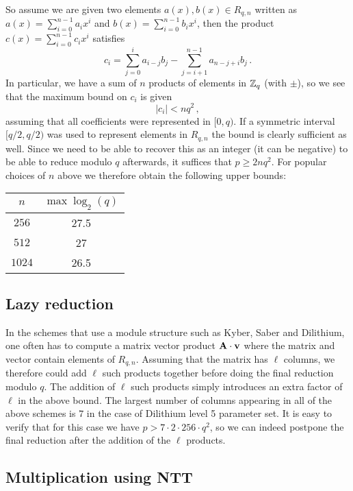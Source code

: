 So assume we are given two elements  $a(x), b(x) \in R_{q,n}$ written as $a(x) = \sum_{i = 0}^{n-1} a_i x^i$
and $b(x) = \sum_{i = 0}^{n-1} b_i x^i$, then the product $c(x) = \sum_{i = 0}^{n-1} c_i x^i$ satisfies
\[  c_i = \sum_{j = 0}^{i} a_{i -j} b_j  - \sum_{j = i+1}^{n-1} a_{n-j+i} b_{j}  \, . \]
In particular, we have a sum of $n$ products of elements
in $\mathbb{Z}_q$ (with $\pm$), so we see that the maximum bound on $c_i$ is given 
\[ |c_i| < n q^2 \, , \]
assuming that all coefficients were represented in $[0,q)$.  If a symmetric interval $[q/2, q/2)$ was used to 
represent elements in $R_{q, n}$ the bound is clearly sufficient as well.  
Since we need to be able to recover this as an integer (it can be negative) to be able to reduce modulo $q$ afterwards,
it suffices that $p \geq 2 n q^2$.  For popular choices of $n$ above we therefore obtain the following upper bounds:
\begin{center}
\begin{tabular}{|c|c|}
\hline
$n$ & $\max \log_2(q)$ \\
\hline
$256$ &  27.5 \\
$512$ &   27 \\
$1024$ &   26.5 \\
\hline
\end{tabular}
\end{center}

\subsection{Lazy reduction} In the schemes that use a module structure such as Kyber, Saber and Dilithium, 
one often has to compute 
a matrix vector product $\mathbf{A} \cdot \mathbf{v}$ where the matrix and vector contain elements of $R_{q,n}$.
Assuming that the matrix has $\ell$ columns, we therefore could add $\ell$ such products together before
doing the final reduction modulo $q$.  The addition of $\ell$ such products simply introduces an extra 
factor of $\ell$ in the above bound.  The largest number of columns appearing in all of the above schemes
is $7$ in the case of Dilithium level 5 parameter set.  It is easy to verify that for this case we have
$p > 7 \cdot 2 \cdot 256 \cdot q^2$, so we can indeed postpone the final reduction after the addition 
of the $\ell$ products.

\subsection{Multiplication using NTT}

